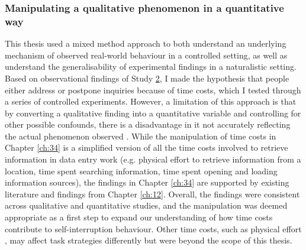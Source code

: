 \subsubsection{Manipulating a qualitative phenomenon in a quantitative way}
This thesis used a mixed method approach to both understand an underlying mechanism of observed real-world behaviour in a controlled setting, as well as understand the generalisability of experimental findings in a naturalistic setting. Based on observational findings of Study \hyperref[st:Study2]{2}, I made the hypothesis that people either address or postpone inquiries because of time costs, which I tested through a series of controlled experiments. However, a limitation of this approach is that by converting a qualitative finding into a quantitative variable and controlling for other possible confounds, there is a disadvantage in it not accurately reflecting the actual phenomenon observed \citep{Driscoll2007}. While the manipulation of time costs in Chapter \ref{ch:34} is a simplified version of all the time costs involved to retrieve information in data entry work (e.g. physical effort to retrieve information from a location, time spent searching information, time spent opening and loading information sources), the findings in Chapter \ref{ch:34} are supported by existing literature and findings from Chapter \ref{ch:12}. Overall, the findings were consistent across qualitative and quantitative studies, and the manipulation was deemed appropriate as a first step to expand our understanding of how time costs contribute to self-interruption behaviour. Other time costs, such as physical effort \citep{Potts2017}, may affect task strategies differently but were beyond the scope of this thesis. 



